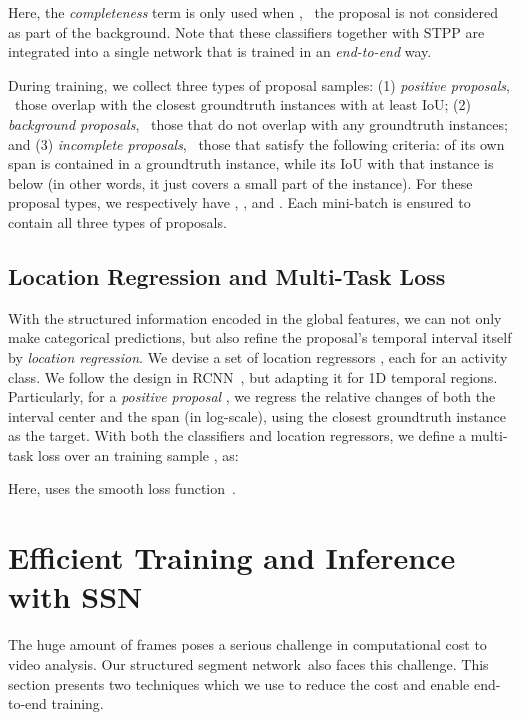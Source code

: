 \documentclass[10pt,twocolumn,letterpaper]{article}
\newcommand{\SSN}{structured segment network}
\begin{document}
Here, the \emph{completeness} term  is only used when
, \ie~the proposal  is not considered as part of the background.
Note that these classifiers together with STPP
are integrated into a single network that is trained in an \emph{end-to-end} way.

During training, we collect three types of proposal samples:
(1) \emph{positive proposals}, \ie~those overlap
with the closest groundtruth instances with at least  IoU;
(2) \emph{background proposals}, \ie~those that do not overlap
with any groundtruth instances; and
(3) \emph{incomplete proposals},
\ie~those that satisfy the following criteria:  of its own span is
contained in a groundtruth instance, while its IoU with that instance is
below  (in other words, it just covers a small part of the instance).
For these proposal types, we respectively have
, , and .
Each mini-batch is ensured to contain all three types of proposals.

\subsection{Location Regression and Multi-Task Loss}

With the structured information encoded in the global features,
we can not only make categorical predictions, but also refine the
proposal's temporal interval itself by \emph{location regression}.
We devise a set of location regressors ,
each for an activity class.
We follow the design in RCNN~\cite{Girshick2014RCNN}, but adapting
it for 1D temporal regions.
Particularly, for a \emph{positive proposal} , we regress
the relative changes of both the interval center  and the span  (in log-scale),
using the closest groundtruth instance as the target.
With both the classifiers and location regressors,
we define a multi-task loss over an training sample , as:

Here,  uses the smooth  loss function~\cite{Girshick2015FRCNN}.
 


\section{Efficient Training and Inference with SSN}

The huge amount of frames poses a serious challenge in computational cost
to video analysis. Our \SSN~also faces this challenge.
This section presents two techniques which we use to reduce
the cost and enable end-to-end training.

\vspace{-12pt}
\end{document}
